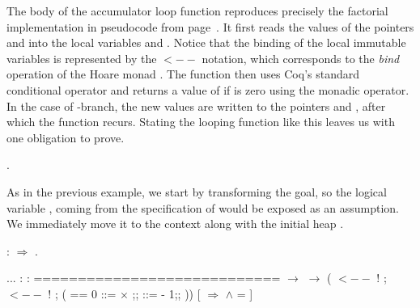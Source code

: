 The body of the accumulator loop function reproduces precisely the
factorial implementation in pseudocode from page~\pageref{ref:facto}. It first reads the values of
the pointers  and  into the local variables  and
. Notice that the binding of the local immutable variables is
represented by the $\mathtt{<--}$ notation, which corresponds to the \textit{bind}
operation of the Hoare monad . The function then uses Coq's
standard conditional operator and returns a value of  if  is
zero using the monadic  operator.  In the case of
-branch, the new values are written to the pointers  and
, after which the function recurs.
Stating the looping function like this leaves us with one obligation
to prove.
\begin{coqdoccode}
\coqdocemptyline
\coqdocnoindent
{} .\coqdoceol
\coqdocemptyline
\end{coqdoccode}


As in the previous example, we start by transforming the goal, so the
logical variable , coming from the specification of  would
be exposed as an assumption. We immediately move it to the context
along with the initial heap .
\begin{coqdoccode}
\coqdocemptyline
\coqdocnoindent
{}: \ensuremath{\Rightarrow} .\coqdoceol
\coqdocemptyline
\end{coqdoccode}
\coqdoceol
\coqdocemptyline
\coqdocindent{1.00em}
...\coqdoceol
\coqdocindent{1.00em}
 : \coqdoceol
\coqdocindent{1.00em}
 : \coqdoceol
\coqdocindent{1.00em}
============================\coqdoceol
\coqdocindent{1.50em}
     \ensuremath{\rightarrow}\coqdoceol
\coqdocindent{1.50em}
  \ensuremath{\rightarrow}\coqdoceol
\coqdocindent{1.50em}
 \coqdoceol
\coqdocindent{2.50em}
( $\mathtt{<--}$ ! ;\coqdoceol
\coqdocindent{3.00em}
 $\mathtt{<--}$ ! ;\coqdoceol
\coqdocindent{3.00em}
(  == 0      ::=  \ensuremath{\times} ;;  ::=  - 1;;  ))\coqdoceol
\coqdocindent{2.50em}
[   \ensuremath{\Rightarrow}      \ensuremath{\land}  =  ]

